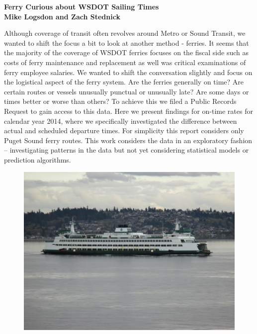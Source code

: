 \documentclass[11pt, letterpaper]{article}
\begin{document}
\Large 
\begin{center}
\bf Ferry Curious about WSDOT Sailing Times \\
\bf Mike Logsdon and Zach Stednick
\end{center} 
\normalsize 


Although coverage of transit often revolves around Metro or Sound Transit, we wanted to shift the focus a bit to look at another method - ferries. It seems that the majority of the coverage of WSDOT ferries focuses on the fiscal side such as costs of ferry maintenance and replacement as well was critical examinations of ferry employee salaries.
We wanted to shift the conversation slightly and focus on the logistical aspect of the ferry system. Are the ferries generally on time? Are certain routes or vessels unusually punctual or unusually late? Are some days or times better or worse than others? To achieve this we filed a Public Records Request to gain access to this data. Here we present findings for on-time rates for calendar year 2014, where we specifically investigated the difference between actual and scheduled departure times. For simplicity this report considers only Puget Sound ferry routes. This work considers the data in an exploratory fashion -- investigating patterns in the data but not yet considering statistical models or prediction algorithms.

\begin{figure}
\begin{center}
\includegraphics[scale = .4]{ferry.jpg}
\end{center}
\end{figure}
\end{document}

